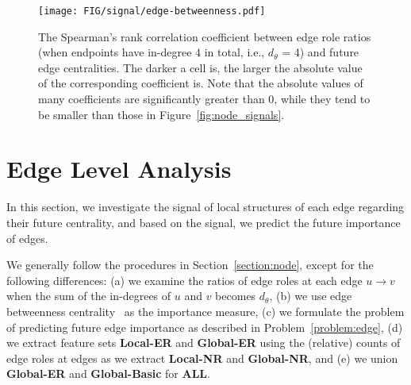 \begin{figure}[t]
    \vspace{-3mm}
     \centering
     \texttt{[image: FIG/signal/edge-betweenness.pdf]} \\
     \vspace{-2mm}
     \caption{\label{fig:edge_signal}
     The Spearman's rank correlation coefficient between edge role ratios 
     (when endpoints have in-degree $4$ in total, i.e., $d_\theta$ = 4)
     and future edge centralities.
     The darker a cell is, the larger the absolute value of the corresponding coefficient is. Note that the absolute values of many coefficients are significantly greater than $0$, while they tend to be smaller than those in Figure~\ref{fig:node_signals}.
     }
     
\end{figure}

\section{Edge Level Analysis}\label{section:edge}

In this section, we investigate the signal of local structures of each edge regarding their future centrality, and based on the signal, we predict the future importance of edges.  

We generally follow the procedures in Section~\ref{section:node}, except for the following differences: (a) we examine the ratios of edge roles at each edge $u\rightarrow v$ when the sum of the in-degrees of $u$ and $v$ becomes $d_\theta$, (b) we use edge betweenness centrality~\cite{freeman1977set} as the importance measure, (c) we formulate the problem of predicting future edge importance as described in Problem~\ref{problem:edge}, (d)
we extract feature sets \textbf{Local-ER} and \textbf{Global-ER} using the (relative) counts of edge roles at edges as we extract \textbf{Local-NR} and \textbf{Global-NR}, and (e) we union \textbf{Global-ER} and \textbf{Global-Basic} for $\textbf{ALL}$.

